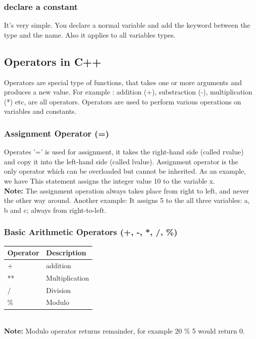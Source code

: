 \documentclass[11pt, a4paper]{article}
\begin{document}
\subsubsection{declare a constant}
It’s very simple. You declare a normal variable and add the keyword  between the type
and the name. Also it applies to all variables types.


\subsection{Operators in C++}
Operators are special type of functions, that takes one or more arguments
and produces a new value. For example : addition (+), substraction (-),
multiplication (*) etc, are all operators. Operators are used to perform
various operations on variables and constants.

\subsubsection{Assignment Operator (=)}
Operates '=' is used for assignment, it takes the right-hand side (called rvalue)
and copy it into the left-hand side (called lvalue). Assignment operator is the
only operator which can be overloaded but cannot be inherited. As an example, we have
 This statement assigns the integer value 10 to the variable x.\\
\textbf{Note:} The assignment operation always takes place from right to left,
and never the other way around. Another example: 
It assigns 5 to the all three variables: a, b and c; always from right-to-left.

\subsubsection{Basic Arithmetic Operators (+, -, *, /, \%)}

\begin{tabular}{ |p{3cm}||p{5cm}| }
    \hline
    \textbf{Operator} & \textbf{Description} \\
    \hline
    +  & addition    \\
    ** &   Multiplication  \\
    / & Division \\
    \%    &Modulo\\
    \hline
\end{tabular}\\
\newline\textbf{Note:} Modulo operator returns remainder, for example 20 \% 5 would return 0.

\end{document}
